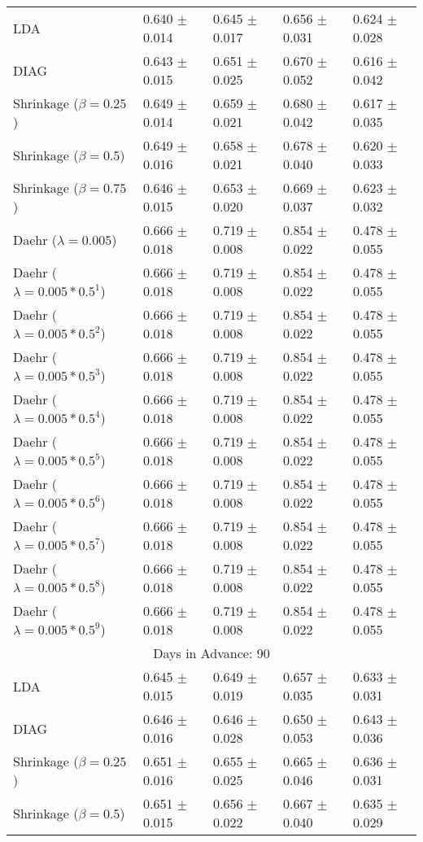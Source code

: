 \begin{table}
\begin{tabular}{*{5}{l}}
LDA&0.640 $\pm$ 0.014&0.645 $\pm$ 0.017&0.656 $\pm$ 0.031&0.624 $\pm$ 0.028\\
DIAG&0.643 $\pm$ 0.015&0.651 $\pm$ 0.025&0.670 $\pm$ 0.052&0.616 $\pm$ 0.042\\
Shrinkage ($\beta=0.25$)&0.649 $\pm$ 0.014&0.659 $\pm$ 0.021&0.680 $\pm$ 0.042&0.617 $\pm$ 0.035\\
Shrinkage ($\beta=0.5$)&0.649 $\pm$ 0.016&0.658 $\pm$ 0.021&0.678 $\pm$ 0.040&0.620 $\pm$ 0.033\\
Shrinkage ($\beta=0.75$)&0.646 $\pm$ 0.015&0.653 $\pm$ 0.020&0.669 $\pm$ 0.037&0.623 $\pm$ 0.032\\
Daehr ($\lambda=0.005$)&0.666 $\pm$ 0.018&0.719 $\pm$ 0.008&0.854 $\pm$ 0.022&0.478 $\pm$ 0.055\\
Daehr ($\lambda=0.005*0.5^1$)&0.666 $\pm$ 0.018&0.719 $\pm$ 0.008&0.854 $\pm$ 0.022&0.478 $\pm$ 0.055\\
Daehr ($\lambda=0.005*0.5^2$)&0.666 $\pm$ 0.018&0.719 $\pm$ 0.008&0.854 $\pm$ 0.022&0.478 $\pm$ 0.055\\
Daehr ($\lambda=0.005*0.5^3$)&0.666 $\pm$ 0.018&0.719 $\pm$ 0.008&0.854 $\pm$ 0.022&0.478 $\pm$ 0.055\\
Daehr ($\lambda=0.005*0.5^4$)&0.666 $\pm$ 0.018&0.719 $\pm$ 0.008&0.854 $\pm$ 0.022&0.478 $\pm$ 0.055\\
Daehr ($\lambda=0.005*0.5^5$)&0.666 $\pm$ 0.018&0.719 $\pm$ 0.008&0.854 $\pm$ 0.022&0.478 $\pm$ 0.055\\
Daehr ($\lambda=0.005*0.5^6$)&0.666 $\pm$ 0.018&0.719 $\pm$ 0.008&0.854 $\pm$ 0.022&0.478 $\pm$ 0.055\\
Daehr ($\lambda=0.005*0.5^7$)&0.666 $\pm$ 0.018&0.719 $\pm$ 0.008&0.854 $\pm$ 0.022&0.478 $\pm$ 0.055\\
Daehr ($\lambda=0.005*0.5^8$)&0.666 $\pm$ 0.018&0.719 $\pm$ 0.008&0.854 $\pm$ 0.022&0.478 $\pm$ 0.055\\
Daehr ($\lambda=0.005*0.5^9$)&0.666 $\pm$ 0.018&0.719 $\pm$ 0.008&0.854 $\pm$ 0.022&0.478 $\pm$ 0.055\\
\hline\multicolumn{5}{c}{  Days in Advance: 90}\\\hline
LDA&0.645 $\pm$ 0.015&0.649 $\pm$ 0.019&0.657 $\pm$ 0.035&0.633 $\pm$ 0.031\\
DIAG&0.646 $\pm$ 0.016&0.646 $\pm$ 0.028&0.650 $\pm$ 0.053&0.643 $\pm$ 0.036\\
Shrinkage ($\beta=0.25$)&0.651 $\pm$ 0.016&0.655 $\pm$ 0.025&0.665 $\pm$ 0.046&0.636 $\pm$ 0.031\\
Shrinkage ($\beta=0.5$)&0.651 $\pm$ 0.015&0.656 $\pm$ 0.022&0.667 $\pm$ 0.040&0.635 $\pm$ 0.029\\

\end{tabular}
\end{table}
